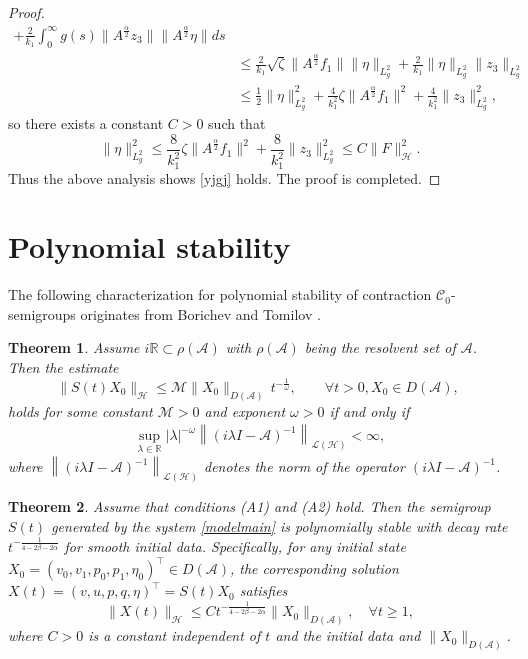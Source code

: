 \documentclass[12pt,reqno]{article}
\newtheorem{theorem}{Theorem}[section] %
\let\Section=\section
\def\section{\setcounter{equation}{0}\Section}
\begin{document}
\begin{proof}
\begin{align*}
			+ \frac{2}{k_1} \int_0^\infty g(s) \| A^{\frac{\alpha}{2}} z_3 \| \| A^{\frac{\alpha}{2}} \eta \| ds \\
			&\leq \frac{2}{k_1} \sqrt{\zeta} \| A^{\frac{\alpha}{2}} f_1 \| \| \eta \|_{L^2_g}
			+ \frac{2}{k_1} \| \eta \|_{L^2_g} \| z_3 \|_{L^2_g}\\
			&\le\frac12\|\eta\|_{L^2_g}^2+\frac{4}{k_1^2}\zeta\| A^{\frac{\alpha}{2}} f_1 \|^2+\frac{4}{k_1^2}\| z_3 \|_{L^2_g}^2,
		\end{align*}
		so there exists a constant $C>0$ such that
		$$\|\eta\|_{L_g^2}^2\le \frac{8}{k_1^2}\zeta\| A^{\frac{\alpha}{2}} f_1 \|^2+\frac{8}{k_1^2}\| z_3 \|_{L^2_g}^2\le C\|F\|_{\mathcal{H}}^2.$$
		Thus the above analysis shows \eqref{yjgj} holds. The proof is completed.
	\end{proof}
	\section{Polynomial stability}\label{sec3}
The following characterization for polynomial stability of contraction $\mathcal{C}_0$-semigroups originates from Borichev and Tomilov \cite{MR2606945}.
\begin{theorem}\label{thmBT}
Assume $i\mathbb{R}\subset \rho(\mathcal{A})$ with $\rho(\mathcal{A})$ being the resolvent set of $\mathcal{A}$. Then the estimate
\[
\|S(t)X_0\|_{\mathcal{H}} \le \mathcal{M}\|X_0\|_{D(\mathcal{A})} \,t^{-\frac1\omega},\qquad \forall  t>0, X_0 \in D(\mathcal{A}),\;
\]
holds for some constant $\mathcal{M}>0$ and exponent $\omega>0$ if and only if
\begin{align}\label{eq:lemma1}
\sup_{\lambda\in\mathbb{R}} |\lambda|^{-\omega} \left\| (i\lambda I - \mathcal{A})^{-1} \right\|_{\mathcal{L}(\mathcal{H})} < \infty,
\end{align}
where $\left\| (i\lambda I - \mathcal{A})^{-1} \right\|_{\mathcal{L}(\mathcal{H})}$ denotes the norm of the operator $(i\lambda I - \mathcal{A})^{-1}$.
\end{theorem}
	\begin{theorem}\label{thmdecay}
		Assume that conditions (A1) and (A2) hold. Then the semigroup \(S(t)\) generated by the system \eqref{modelmain} is polynomially stable with decay rate \(t^{-\frac{1}{4-2\beta-2\alpha}}\) for smooth initial data. Specifically, for any initial state \(X_0=(v_0, v_1, p_0, p_1, \eta_0)^\top \in D(\mathcal{A})\), the corresponding solution $X(t)=(v,u,p,q,\eta)^\top=S(t)X_0$ satisfies
		\[
		\|X(t)\|_{\mathcal{H}} \leq C t^{-\frac{1}{4-2\beta-2\alpha}} \|X_0\|_{D(\mathcal{A})}, \quad \forall t \geq 1,
		\]
		where \(C > 0\) is a constant independent of \(t\) and the initial data and $\|X_0\|_{D(\mathcal{A})}$.
	\end{theorem}
\end{document}
